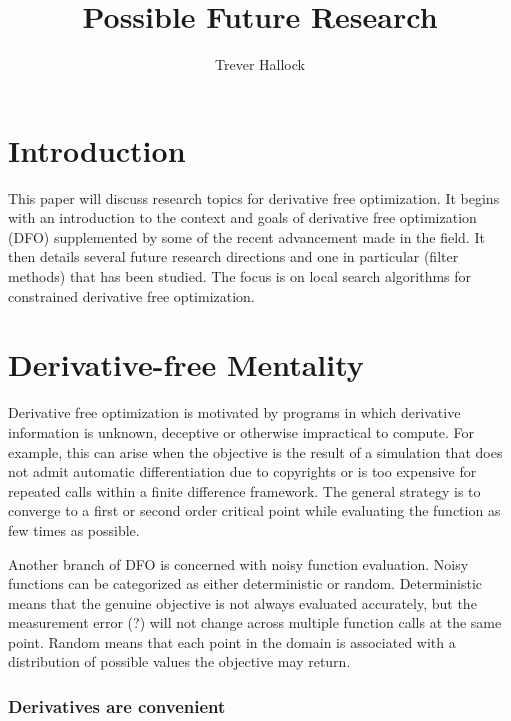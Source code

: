 \documentclass{article}
\title{Possible Future Research}
\author{Trever Hallock}
\begin{document}
%
\algnewcommand{\Goto}{\algorithmicgoto\xspace}%
\algnewcommand{\Label}{\State\unskip}


\maketitle


\tableofcontents

\section{Introduction}

This paper will discuss research topics for derivative free optimization.
It begins with an introduction to the context and goals of derivative free optimization (DFO) supplemented by some of the recent advancement made in the field.
It then details several future research directions and one in particular (filter methods) that has been studied.
The focus is on local search algorithms for constrained derivative free optimization.


\section{Derivative-free Mentality}

Derivative free optimization is motivated by programs in which derivative information is unknown, deceptive or otherwise impractical to compute.
For example, this can arise when the objective is the result of a simulation that does not admit automatic differentiation due to copyrights or is too expensive for repeated calls within a finite difference framework.
The general strategy is to converge to a first or second order critical point while evaluating the function as few times as possible.

Another branch of DFO is concerned with noisy function evaluation.
Noisy functions can be categorized as either deterministic or random.
Deterministic means that the genuine objective is not always evaluated accurately, but the measurement error (?) will not change across multiple function calls at the same point.
Random means that each point in the domain is associated with a distribution of possible values the objective may return.

\subsubsection{Derivatives are convenient}
\end{document}
